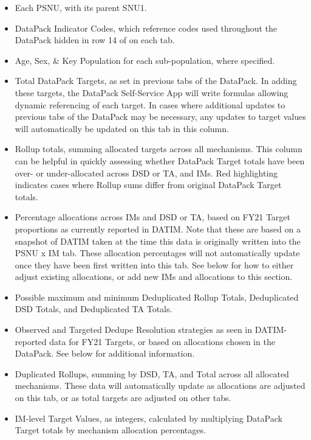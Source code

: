 \documentclass[
  openany]{book}
\begin{document}
\begin{itemize}
\item
  Each PSNU, with its parent SNU1.
\item
  DataPack Indicator Codes, which reference codes used throughout the
  DataPack hidden in row 14 of on each tab.
\item
  Age, Sex, \& Key Population for each sub-population, where specified.
\item
  Total DataPack Targets, as set in previous tabs of the DataPack. In
  adding these targets, the DataPack Self-Service App will write
  formulas allowing dynamic referencing of each target. In cases where
  additional updates to previous tabs of the DataPack may be
  necessary, any updates to target values will automatically be
  updated on this tab in this column.
\item
  Rollup totals, summing allocated targets across all mechanisms. This
  column can be helpful in quickly assessing whether DataPack Target
  totals have been over- or under-allocated across DSD or TA, and IMs.
  Red highlighting indicates cases where Rollup sums differ from
  original DataPack Target totals.
\item
  Percentage allocations across IMs and DSD or TA, based on FY21
  Target proportions as currently reported in DATIM. Note that these
  are based on a snapshot of DATIM taken at the time this data is
  originally written into the PSNU x IM tab. These allocation
  percentages will not automatically update once they have been first
  written into this tab. See below for how to either adjust existing
  allocations, or add new IMs and allocations to this section.
\item
  Possible maximum and minimum Deduplicated Rollup Totals,
  Deduplicated DSD Totals, and Deduplicated TA Totals.
\item
  Observed and Targeted Dedupe Resolution strategies as seen in
  DATIM-reported data for FY21 Targets, or based on allocations chosen
  in the DataPack. See below for additional information.
\item
  Duplicated Rollups, summing by DSD, TA, and Total across all
  allocated mechanisms. These data will automatically update as
  allocations are adjusted on this tab, or as total targets are
  adjusted on other tabs.
\item
  IM-level Target Values, as integers, calculated by multiplying
  DataPack Target totals by mechanism allocation percentages.
\end{itemize}
\end{document}
